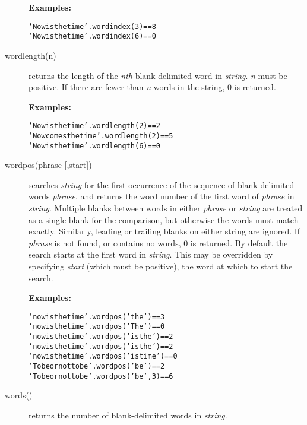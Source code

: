 \begin{description}
\textbf{Examples:}
\begin{alltt}
'Now is the time'.wordindex(3) == 8
'Now is the time'.wordindex(6) == 0
\end{alltt}

\item[wordlength(n)]\label{refwordlen}
returns the length of the \emph{n}\emph{th} blank-delimited word in
\emph{string}.
\emph{n} must be positive.
If there are fewer than \emph{n} words in the string, 0 is returned.
 
\textbf{Examples:}
\begin{alltt}
'Now is the time'.wordlength(2)    == 2
'Now comes the time'.wordlength(2) == 5
'Now is the time'.wordlength(6)    == 0
\end{alltt}

\item[wordpos(phrase [,start{]})]\label{refwordpos}
searches \emph{string} for the first occurrence of the sequence
of blank-delimited words \emph{phrase}, and returns the word number
of the first word of \emph{phrase} in \emph{string}.  Multiple
blanks between words in either \emph{phrase} or \emph{string}
are treated as a single blank for the comparison, but otherwise the
words must match exactly.  Similarly, leading or trailing blanks on
either string are ignored.
If \emph{phrase} is not found, or contains no words, 0 is returned.
 By default the search starts at the first word in \emph{string}.
This may be overridden by specifying \emph{start} (which must be
positive), the word at which to start the search.
 
\textbf{Examples:}
\begin{alltt}
'now is the time'.wordpos('the')       == 3
'now is the time'.wordpos('The')       == 0
'now is the time'.wordpos('is the')    == 2
'now is the time'.wordpos('is    the') == 2
'now is the time'.wordpos('is  time')  == 0
'To be or not to be'.wordpos('be')     == 2
'To be or not to be'.wordpos('be',3)   == 6
\end{alltt}

\item[words()]\label{refwords}
returns the number of blank-delimited words in \emph{string}.
 

\end{description}
